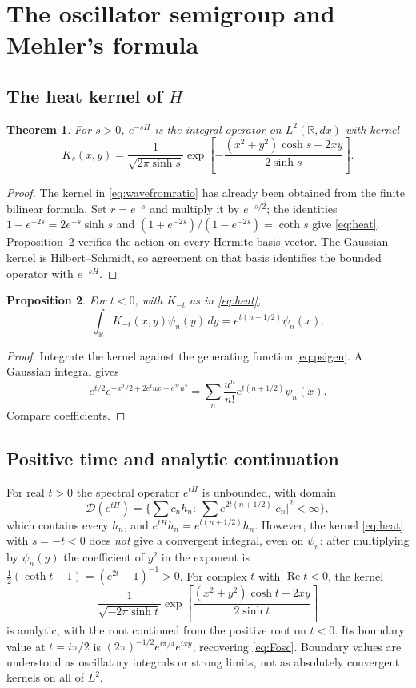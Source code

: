 \documentclass[11pt,reqno]{amsart}
\newtheorem{theorem}{Theorem}[section]
\newtheorem{proposition}[theorem]{Proposition}
\theoremstyle{definition}
\theoremstyle{remark}
\newcommand{\R}{\mathbb R}
\begin{document}
\section{The oscillator semigroup and Mehler's formula}\label{L:mehler}

\subsection{The heat kernel of $H$}
\begin{theorem}\label{thm:heat}
For $s>0$, $e^{-sH}$ is the integral operator on $L^2(\R,dx)$ with kernel
\begin{equation}\label{eq:heat}
K_s(x,y)=\frac1{\sqrt{2\pi\sinh s}}
\exp\left[-\frac{(x^2+y^2)\cosh s-2xy}{2\sinh s}\right].
\end{equation}
\end{theorem}
\begin{proof}
The kernel in \eqref{eq:wavefromratio} has already been obtained from
the finite bilinear formula. Set $r=e^{-s}$ and multiply it by
$e^{-s/2}$; the identities
$1-e^{-2s}=2e^{-s}\sinh s$ and
$(1+e^{-2s})/(1-e^{-2s})=\coth s$ give \eqref{eq:heat}.
Proposition~\ref{prop:onbasis} verifies the action on every Hermite
basis vector. The Gaussian kernel is Hilbert--Schmidt, so agreement
on that basis identifies the bounded operator with $e^{-sH}$.
\end{proof}

\begin{proposition}\label{prop:onbasis}
For $t<0$, with $K_{-t}$ as in \eqref{eq:heat},
\[
\int_\R K_{-t}(x,y)\psi_n(y)\,dy=e^{t(n+1/2)}\psi_n(x).
\]
\end{proposition}
\begin{proof}
Integrate the kernel against the generating function \eqref{eq:psigen}.
A Gaussian integral gives
\[
e^{t/2}e^{-x^2/2+2e^tux-e^{2t}u^2}
=\sum_n\frac{u^n}{n!}e^{t(n+1/2)}\psi_n(x).
\]
Compare coefficients.
\end{proof}

\subsection{Positive time and analytic continuation}
For real $t>0$ the spectral operator $e^{tH}$ is unbounded, with domain
\[
\mathcal D(e^{tH})=\Big\{\sum c_nh_n:\ \sum e^{2t(n+1/2)}|c_n|^2<\infty\Big\},
\]
which contains every $h_n$, and $e^{tH}h_n=e^{t(n+1/2)}h_n$. However, the
kernel \eqref{eq:heat} with $s=-t<0$ does \emph{not} give a convergent
integral, even on $\psi_n$: after multiplying by $\psi_n(y)$ the
coefficient of $y^2$ in the exponent is
$\frac12(\coth t-1)=(e^{2t}-1)^{-1}>0$. For complex $t$ with
$\operatorname{Re}t<0$, the kernel
\[
\frac1{\sqrt{-2\pi\sinh t}}
\exp\left[\frac{(x^2+y^2)\cosh t-2xy}{2\sinh t}\right]
\]
is analytic, with the root continued from the positive root on
$t<0$. Its boundary value at $t=i\pi/2$ is
$(2\pi)^{-1/2}e^{i\pi/4}e^{ixy}$, recovering \eqref{eq:Fosc}.
Boundary values are understood as oscillatory integrals or strong
limits, not as absolutely convergent kernels on all of $L^2$.
\end{document}
